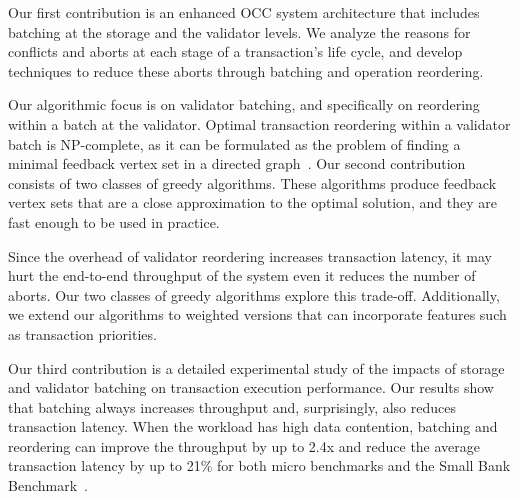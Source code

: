Our first contribution is an enhanced OCC system architecture that includes batching at the storage and the validator levels. We analyze the reasons for conflicts and aborts at each stage of a transaction's life cycle, and develop techniques to reduce these aborts through batching and operation reordering.

Our algorithmic focus is on validator batching, and specifically on reordering within a batch at the validator. Optimal transaction reordering within a validator batch is NP-complete, as it can be formulated as the problem of finding a minimal feedback vertex set in a directed graph~\cite{karp1972reducibility}. Our second contribution consists of two classes of greedy algorithms. These algorithms produce feedback vertex sets that are a close approximation to the optimal solution, and they are fast enough to be used in practice. 


Since the overhead of validator reordering increases transaction latency, it may hurt the end-to-end throughput of the system even it reduces the number of aborts. Our two classes of greedy algorithms explore this trade-off. Additionally, we extend our algorithms to weighted versions that can incorporate features such as transaction priorities.



Our third contribution is a detailed experimental study of the impacts of storage and validator batching on transaction execution performance. 
Our results show that batching always increases throughput and, surprisingly, also reduces transaction latency. When the workload has high data contention, batching and reordering can improve the throughput by up to 2.4x and reduce the average transaction latency by up to 21\% for both micro benchmarks and the Small Bank Benchmark~\cite{alomari2008icde}.

